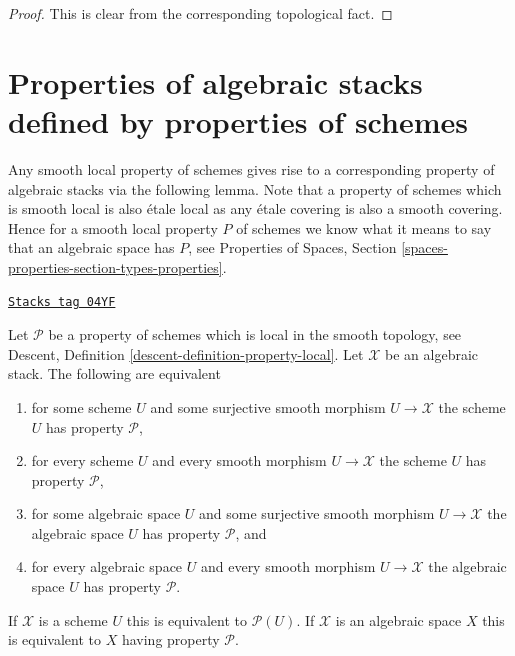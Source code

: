 \begin{proof}
This is clear from the corresponding topological fact.
\end{proof}

\section{Properties of algebraic stacks defined by properties of schemes}
\label{stacks-properties-section-types-properties}
Any smooth local property of schemes gives rise to a corresponding
property of algebraic stacks via the following lemma. Note that a
property of schemes which is smooth local is also \'etale local
as any \'etale covering is also a smooth covering. Hence for a smooth
local property $P$ of schemes we know what it means to say that
an algebraic space has $P$, see
Properties of Spaces, Section \ref{spaces-properties-section-types-properties}.

\begin{lemma}
\label{stacks-properties-lemma-type-property}
\href{https://stacks.math.columbia.edu/tag/04YF}{\texttt{Stacks tag 04YF}}

Let $\mathcal{P}$ be a property of schemes which is local in the smooth
topology, see
Descent, Definition \ref{descent-definition-property-local}.
Let $\mathcal{X}$ be an algebraic stack. The following are equivalent
\begin{enumerate}
\item for some scheme $U$ and some surjective smooth morphism
$U \to \mathcal{X}$ the scheme $U$ has property $\mathcal{P}$,
\item for every scheme $U$ and every smooth morphism $U \to \mathcal{X}$
the scheme $U$ has property $\mathcal{P}$,
\item for some algebraic space $U$ and some surjective smooth morphism
$U \to \mathcal{X}$ the algebraic space $U$ has property $\mathcal{P}$, and
\item for every algebraic space $U$ and every smooth morphism
$U \to \mathcal{X}$ the algebraic space $U$ has property $\mathcal{P}$.
\end{enumerate}
If $\mathcal{X}$ is a scheme $U$ this is equivalent to $\mathcal{P}(U)$.
If $\mathcal{X}$ is an algebraic space $X$ this is equivalent to
$X$ having property $\mathcal{P}$.
\end{lemma}

